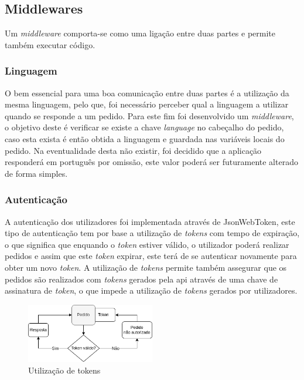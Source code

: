 \subsection{Middlewares} 
Um \textit{middleware} comporta-se como uma ligação entre duas partes e permite também executar código.

\subsubsection{Linguagem}
O bem essencial para uma boa comunicação entre duas partes é a utilização da mesma linguagem, pelo que, foi necessário perceber qual a linguagem a utilizar quando se responde a um pedido. Para este fim foi desenvolvido um \textit{middleware}, o objetivo deste é verificar se existe a chave \textit{language} no cabeçalho do pedido, caso esta exista é então obtida a linguagem e guardada nas variáveis locais do pedido. Na eventualidade desta não existir, foi decidido que a aplicação responderá em português por omissão, este valor poderá ser futuramente alterado de forma simples.

\newpage

\subsubsection{Autenticação}
A autenticação dos utilizadores foi implementada através de JsonWebToken, este tipo de autenticação tem por base a utilização de \textit{tokens} com tempo de expiração, o que significa que enquando o \textit{token} estiver válido, o utilizador poderá realizar pedidos e assim que este \textit{token} expirar, este terá de se autenticar novamente para obter um novo \textit{token}.
A utilização de \textit{tokens} permite também assegurar que os pedidos são realizados com \textit{tokens} gerados pela api através de uma chave de assinatura de \textit{token}, o que impede a utilização de \textit{tokens} gerados por utilizadores.
\begin{figure}[htb]
  \centering
  \includegraphics[width=0.5\textwidth]{images/implementacao/api/jwt_session.png}
  \caption{Utilização de tokens}
  \label{fig:64}
\end{figure}

